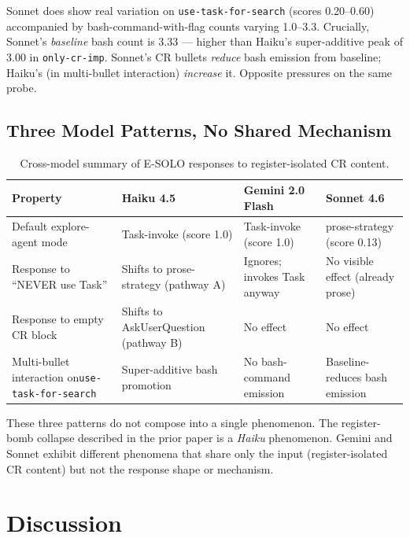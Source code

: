 \documentclass[11pt,a4paper]{article}
\begin{document}
Sonnet does show real variation on \texttt{use-task-for-search}
(scores 0.20--0.60) accompanied by bash-command-with-flag counts
varying 1.0--3.3. Crucially, Sonnet's \emph{baseline} bash count is
3.33 --- higher than Haiku's super-additive peak of 3.00 in
\texttt{only-cr-imp}. Sonnet's CR bullets \emph{reduce} bash emission
from baseline; Haiku's (in multi-bullet interaction) \emph{increase}
it. Opposite pressures on the same probe.

\subsection{Three Model Patterns, No Shared Mechanism}

\begin{table}[H]
\centering
\caption{Cross-model summary of E-SOLO responses to register-isolated
CR content.}
\label{tab:crossmodel}
\small
\begin{tabularx}{\textwidth}{lXXX}
\toprule
Property & Haiku 4.5 & Gemini 2.0 Flash & Sonnet 4.6 \\
\midrule
Default explore-agent mode & Task-invoke (score 1.0) &
Task-invoke (score 1.0) & prose-strategy (score 0.13) \\
Response to ``NEVER use Task'' & Shifts to prose-strategy
(pathway A) & Ignores; invokes Task anyway & No visible effect
(already prose) \\
Response to empty CR block & Shifts to AskUserQuestion
(pathway B) & No effect & No effect \\
Multi-bullet interaction on\newline\texttt{use-task-for-search} &
Super-additive bash promotion & No bash-command emission &
Baseline-reduces bash emission \\
\bottomrule
\end{tabularx}
\end{table}

These three patterns do not compose into a single phenomenon.
The register-bomb collapse described in the prior paper
\citep{mason2026registerbombs} is a \emph{Haiku} phenomenon.
Gemini and Sonnet exhibit different phenomena that share only the
input (register-isolated CR content) but not the response shape or
mechanism.

\section{Discussion}
\end{document}
